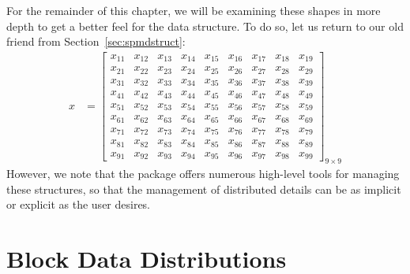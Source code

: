 For the remainder of this chapter, we will be examining these shapes in more depth to get a better feel for the data structure.  To do so, let us return to our old friend from Section~\ref{sec:spmdstruct}:\\
\begin{align*}
x &= \left[
      \begin{array}{lllllllll}
      x_{11} & x_{12} & x_{13} & x_{14} & x_{15} & x_{16} & x_{17} & x	_{18} & x_{19}\\
      x_{21} & x_{22} & x_{23} & x_{24} & x_{25} & x_{26} & x_{27} & x	_{28} & x_{29}\\
      x_{31} & x_{32} & x_{33} & x_{34} & x_{35} & x_{36} & x_{37} & x	_{38} & x_{39}\\
      x_{41} & x_{42} & x_{43} & x_{44} & x_{45} & x_{46} & x_{47} & x	_{48} & x_{49}\\
      x_{51} & x_{52} & x_{53} & x_{54} & x_{55} & x_{56} & x_{57} & x	_{58} & x_{59}\\
      x_{61} & x_{62} & x_{63} & x_{64} & x_{65} & x_{66} & x_{67} & x	_{68} & x_{69}\\
      x_{71} & x_{72} & x_{73} & x_{74} & x_{75} & x_{76} & x_{77} & x	_{78} & x_{79}\\
      x_{81} & x_{82} & x_{83} & x_{84} & x_{85} & x_{86} & x_{87} & x	_{88} & x_{89}\\
      x_{91} & x_{92} & x_{93} & x_{94} & x_{95} & x_{96} & x_{97} & x	_{98} & x_{99}
      \end{array}
\right]_{9\times 9}
\end{align*}
However, we note that the  package offers numerous high-level tools for managing these structures, so that the management of distributed details can be as implicit or explicit as the user desires.

\section{Block Data Distributions}

